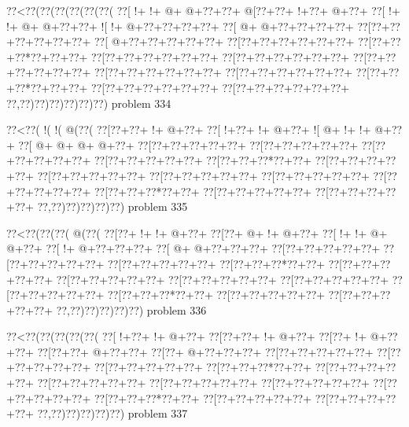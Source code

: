 \vbox{\vbox{\goo
\0??<\0??(\0??(\0??(\0??(\0??(\0??(
\0??[\- !+\- !+\- @+\- @+\0??+\0??+
\- @[\0??+\0??+\- !+\0??+\- @+\0??+
\0??[\- !+\- !+\- @+\- @+\0??+\0??+
\- ![\- !+\- @+\0??+\0??+\0??+\0??+
\0??[\- @+\- @+\0??+\0??+\0??+\0??+
\0??[\0??+\0??+\0??+\0??+\0??+\0??+
\0??[\- @+\0??+\0??+\0??+\0??+\0??+
\0??[\0??+\0??+\0??+\0??+\0??+\0??+
\0??[\0??+\0??+\0??*\0??+\0??+\0??+
\0??[\0??+\0??+\0??+\0??+\0??+\0??+
\0??[\0??+\0??+\0??+\0??+\0??+\0??+
\0??[\0??+\0??+\0??+\0??+\0??+\0??+
\0??[\0??+\0??+\0??+\0??+\0??+\0??+
\0??[\0??+\0??+\0??+\0??+\0??+\0??+
\0??[\0??+\0??+\0??*\0??+\0??+\0??+
\0??[\0??+\0??+\0??+\0??+\0??+\0??+
\0??[\0??+\0??+\0??+\0??+\0??+\0??+
\0??,\0??)\0??)\0??)\0??)\0??)\0??)
}
\hfil problem 334\hfil\break
}

\vbox{\vbox{\goo
\0??<\0??(\- !(\- !(\- @(\0??(
\0??[\0??+\0??+\- !+\- @+\0??+
\0??[\- !+\0??+\- !+\- @+\0??+
\- ![\- @+\- !+\- !+\- @+\0??+
\0??[\- @+\- @+\- @+\- @+\0??+
\0??[\0??+\0??+\0??+\0??+\0??+
\0??[\0??+\0??+\0??+\0??+\0??+
\0??[\0??+\0??+\0??+\0??+\0??+
\0??[\0??+\0??+\0??+\0??+\0??+
\0??[\0??+\0??+\0??*\0??+\0??+
\0??[\0??+\0??+\0??+\0??+\0??+
\0??[\0??+\0??+\0??+\0??+\0??+
\0??[\0??+\0??+\0??+\0??+\0??+
\0??[\0??+\0??+\0??+\0??+\0??+
\0??[\0??+\0??+\0??+\0??+\0??+
\0??[\0??+\0??+\0??*\0??+\0??+
\0??[\0??+\0??+\0??+\0??+\0??+
\0??[\0??+\0??+\0??+\0??+\0??+
\0??,\0??)\0??)\0??)\0??)\0??)
}
\hfil problem 335\hfil\break
}

\vbox{\vbox{\goo
\0??<\0??(\0??(\0??(\- @(\0??(
\0??[\0??+\- !+\- !+\- @+\0??+
\0??[\0??+\- @+\- !+\- @+\0??+
\0??[\- !+\- !+\- @+\- @+\0??+
\0??[\- !+\- @+\0??+\0??+\0??+
\0??[\- @+\- @+\0??+\0??+\0??+
\0??[\0??+\0??+\0??+\0??+\0??+
\0??[\0??+\0??+\0??+\0??+\0??+
\0??[\0??+\0??+\0??+\0??+\0??+
\0??[\0??+\0??+\0??*\0??+\0??+
\0??[\0??+\0??+\0??+\0??+\0??+
\0??[\0??+\0??+\0??+\0??+\0??+
\0??[\0??+\0??+\0??+\0??+\0??+
\0??[\0??+\0??+\0??+\0??+\0??+
\0??[\0??+\0??+\0??+\0??+\0??+
\0??[\0??+\0??+\0??*\0??+\0??+
\0??[\0??+\0??+\0??+\0??+\0??+
\0??[\0??+\0??+\0??+\0??+\0??+
\0??,\0??)\0??)\0??)\0??)\0??)
}
\hfil problem 336\hfil\break
}

\vbox{\vbox{\goo
\0??<\0??(\0??(\0??(\0??(\0??(
\0??[\- !+\0??+\- !+\- @+\0??+
\0??[\0??+\0??+\- !+\- @+\0??+
\0??[\0??+\- !+\- @+\0??+\0??+
\0??[\0??+\0??+\- @+\0??+\0??+
\0??[\0??+\- @+\0??+\0??+\0??+
\0??[\0??+\0??+\0??+\0??+\0??+
\0??[\0??+\0??+\0??+\0??+\0??+
\0??[\0??+\0??+\0??+\0??+\0??+
\0??[\0??+\0??+\0??*\0??+\0??+
\0??[\0??+\0??+\0??+\0??+\0??+
\0??[\0??+\0??+\0??+\0??+\0??+
\0??[\0??+\0??+\0??+\0??+\0??+
\0??[\0??+\0??+\0??+\0??+\0??+
\0??[\0??+\0??+\0??+\0??+\0??+
\0??[\0??+\0??+\0??*\0??+\0??+
\0??[\0??+\0??+\0??+\0??+\0??+
\0??[\0??+\0??+\0??+\0??+\0??+
\0??,\0??)\0??)\0??)\0??)\0??)
}
\hfil problem 337\hfil\break
}

